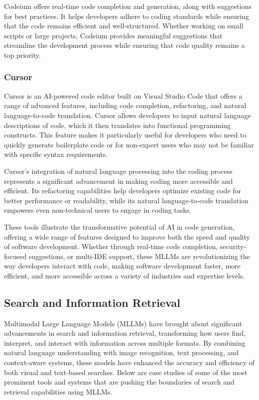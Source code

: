 Codeium offers real-time code completion and generation, along with suggestions for best practices. It helps developers adhere to coding standards while ensuring that the code remains efficient and well-structured. Whether working on small scripts or large projects, Codeium provides meaningful suggestions that streamline the development process while ensuring that code quality remains a top priority.

\subsubsection{Cursor}

Cursor \cite{vaithilingam2023towards} is an AI-powered code editor built on Visual Studio Code that offers a range of advanced features, including code completion, refactoring, and natural language-to-code translation. Cursor allows developers to input natural language descriptions of code, which it then translates into functional programming constructs. This feature makes it particularly useful for developers who need to quickly generate boilerplate code or for non-expert users who may not be familiar with specific syntax requirements.

Cursor's integration of natural language processing into the coding process represents a significant advancement in making coding more accessible and efficient. Its refactoring capabilities help developers optimize existing code for better performance or readability, while its natural language-to-code translation empowers even non-technical users to engage in coding tasks.

These tools illustrate the transformative potential of AI in code generation, offering a wide range of features designed to improve both the speed and quality of software development. Whether through real-time code completion, security-focused suggestions, or multi-IDE support, these MLLMs are revolutionizing the way developers interact with code, making software development faster, more efficient, and more accessible across a variety of industries and expertise levels.

\subsection{Search and Information Retrieval}

Multimodal Large Language Models (MLLMs) have brought about significant advancements in search and information retrieval, transforming how users find, interpret, and interact with information across multiple formats. 
By combining natural language understanding with image recognition, text processing, and context-aware systems, these models have enhanced the accuracy and efficiency of both visual and text-based searches. 
Below are case studies of some of the most prominent tools and systems that are pushing the boundaries of search and retrieval capabilities using MLLMs.

